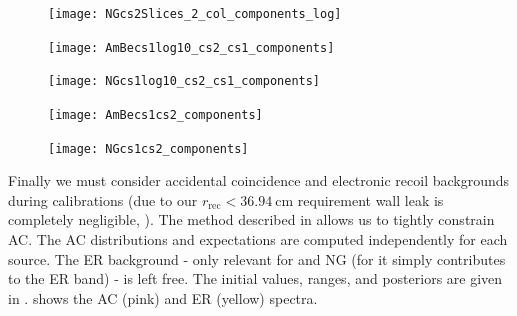 \begin{figure}
\centering
\texttt{[image: NGcs2Slices\_2\_col\_components\_log]}
\label{fig:er_nr_calibrations_results_ng_cs1}
\end{figure}

\begin{figure}
\centering
\texttt{[image: AmBecs1log10\_cs2\_cs1\_components]}
\label{fig:er_nr_calibrations_results_ng_cs1}
\end{figure}

\begin{figure}
\centering
\texttt{[image: NGcs1log10\_cs2\_cs1\_components]}
\label{fig:er_nr_calibrations_results_ng_cs1}
\end{figure}

\begin{figure}
\centering
\texttt{[image: AmBecs1cs2\_components]}
\label{fig:er_nr_calibrations_results_ng_cs1}
\end{figure}

\begin{figure}
\centering
\texttt{[image: NGcs1cs2\_components]}
\label{fig:er_nr_calibrations_results_ng_cs1}
\end{figure}

Finally we must consider accidental coincidence and electronic recoil backgrounds during calibrations (due to our
$r_{\mathrm{rec}} < 36.94\ \mathrm{cm}$
requirement wall leak is completely negligible, ).  The method
described in  allows us to tightly constrain AC.  The AC
distributions and expectations are computed independently for each source.  The ER background - only relevant for \ambe and NG
(for  it simply contributes to the ER band) - is left free.  The initial values, ranges, and posteriors are given in
.   shows the AC (pink) and ER (yellow)
spectra.

